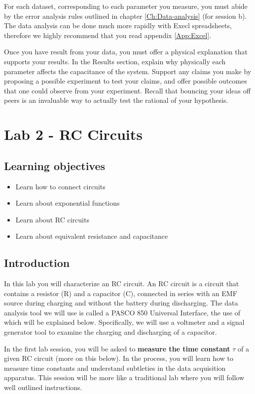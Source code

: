 \documentclass[12pt]{report}
\begin{document}
For each dataset, corresponding to each parameter you measure, you must abide by the error analysis rules outlined in chapter \ref{Ch:Data-analysis} (for session b). 
The data analysis can be done much more rapidly with Execl spreadsheets, therefore we highly recommend that you read appendix \ref{App:Excel}. 

Once you have  result from your data, you must offer a physical explanation that supports your results. {\color{blue} In the Results section, explain why physically each parameter affects the capacitance of the system. Support any claims you make by proposing a possible experiment to test your claims, and offer possible outcomes that one could observe from your experiment.} Recall that bouncing your ideas off peers is an invaluable way to actually test the rational of your hypothesis.

\chapter{Lab 2 - RC Circuits}
\section{Learning objectives}
\begin{itemize}
\item Learn how to connect circuits
\item Learn about exponential functions
\item Learn about RC circuits
\item Learn about equivalent resistance and capacitance
\end{itemize}

\section{Introduction}
In this lab you will characterize an RC circuit. An RC circuit is a circuit that contains a resistor (R) and a capacitor (C), connected in series with an EMF source during charging and without the battery during discharging.  
The data analysis tool we will use is called a PASCO 850 Universal Interface, the use of which will be explained below. 
Specifically, we will  use a voltmeter and a 
signal generator tool to examine the charging and discharging of a capacitor. 

In the first lab session, you will be asked to \textbf{measure the time constant} $\tau$ of a given RC circuit (more on tbis below). 
In the process, you will learn how to measure time constants and understand subtleties in the data acquisition apparatus. 
This session will be more like a traditional lab where you will follow well outlined instructions. 
\end{document}

